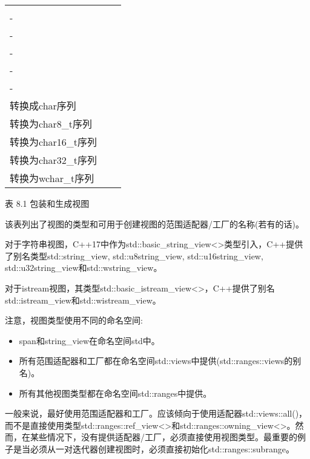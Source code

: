 \begin{longtable}[c]{|l|l|l|}
\begin{tabular}[c]{@{}l@{}}-\\ -\\ -\\ -\\ -\\ -\end{tabular} &
\begin{tabular}[c]{@{}l@{}}字符的只读视图\\   转换成char序列\\   转换为char8\_t序列\\   转换为char16\_t序列\\   转换为char32\_t序列\\   转换为wchar\_t序列\end{tabular} \\ \hline
\end{longtable}

\begin{center}
表 8.1 包装和生成视图
\end{center}

该表列出了视图的类型和可用于创建视图的范围适配器/工厂的名称(若有的话)。

对于字符串视图，C++17中作为std::basic\_string\_view<>类型引入，C++提供了别名类型std::string\_view, std::u8string\_view, std::u16string\_view, std::u32string\_view和std::wstring\_view。

对于istream视图，其类型std::basic\_istream\_view<>，C++提供了别名std::istream\_view和std::wistream\_view。

注意，视图类型使用不同的命名空间:

\begin{itemize}
\item
span和string\_view在命名空间std中。

\item
所有范围适配器和工厂都在命名空间std::views中提供(std::ranges::views的别名)。

\item
所有其他视图类型都在命名空间std::ranges中提供。
\end{itemize}

一般来说，最好使用范围适配器和工厂。应该倾向于使用适配器std::views::all()，而不是直接使用类型std::ranges::ref\_view<>和std::ranges::owning\_view<>。然而，在某些情况下，没有提供适配器/工厂，必须直接使用视图类型。最重要的例子是当必须从一对迭代器创建视图时，必须直接初始化std::ranges::subrange。


